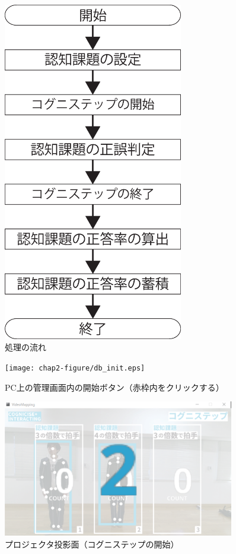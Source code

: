 \begin{figure}[tbp]
	\centering
			\includegraphics[width=0.7\textwidth]{chap2-figure/system_flow.eps}
	\caption{処理の流れ}
	\label{fig:system_flow}
\end{figure}

\begin{figure}[tbp]
	\centering
			\texttt{[image: chap2-figure/db\_init.eps]}
	\caption{PC上の管理画面内の開始ボタン（赤枠内をクリックする）}
	\label{fig:db_start}
\end{figure}

\begin{figure}[tbp]
	\centering
			\includegraphics[width=0.9\textwidth]{chap2-figure/vm_start.eps}
	\caption{プロジェクタ投影面（コグニステップの開始）}
	\label{fig:vm_start}
\end{figure}

